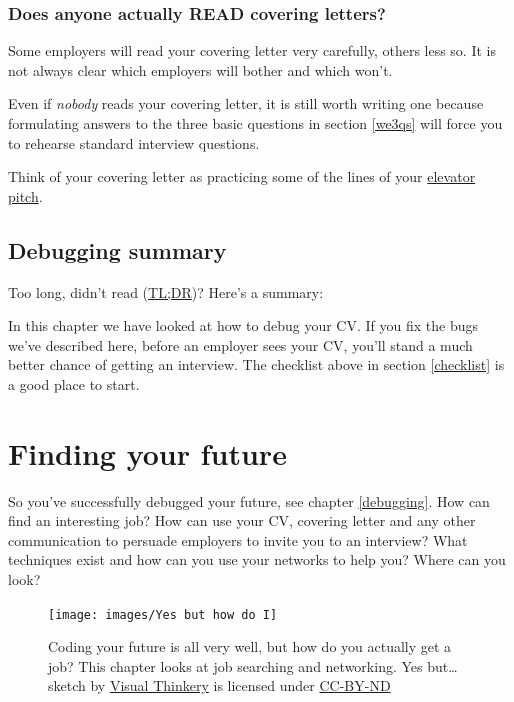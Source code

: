 \documentclass[
]{book}
\begin{document}
\hypertarget{elevatorpitch}{%
\subsection{Does anyone actually READ covering letters?}\label{elevatorpitch}}

Some employers will read your covering letter very carefully, others less so. It is not always clear which employers will bother and which won't.

Even if \emph{nobody} reads your covering letter, it is still worth writing one because formulating answers to the three basic questions in section \ref{we3qs} will force you to rehearse standard interview questions.

Think of your covering letter as practicing some of the lines of your \href{https://en.wikipedia.org/wiki/Elevator_pitch}{elevator pitch}.

\hypertarget{tldr7}{%
\section{Debugging summary}\label{tldr7}}

Too long, didn't read (\href{https://en.wiktionary.org/wiki/too_long;_didn\%27t_read}{TL;DR})? Here's a summary:

In this chapter we have looked at how to debug your CV. If you fix the bugs we've described here, before an employer sees your CV, you'll stand a much better chance of getting an interview. The checklist above in section \ref{checklist} is a good place to start.

\hypertarget{finding}{%
\chapter{Finding your future}\label{finding}}

So you've successfully debugged your future, see chapter \ref{debugging}. How can find an interesting job? How can use your CV, covering letter and any other communication to persuade employers to invite you to an interview? What techniques exist and how can you use your networks to help you? Where can you look? 🔭

\begin{figure}

{\centering \texttt{[image: images/Yes but how do I]} 

}

\caption{Coding your future is all very well, but how do you actually get a job? This chapter looks at job searching and networking. Yes but\ldots{} sketch by \href{https://visualthinkery.com}{Visual Thinkery} is licensed under \href{https://creativecommons.org/licenses/by-nd/4.0/}{CC-BY-ND}}\label{fig:yesbut-fig}
\end{figure}
\end{document}
